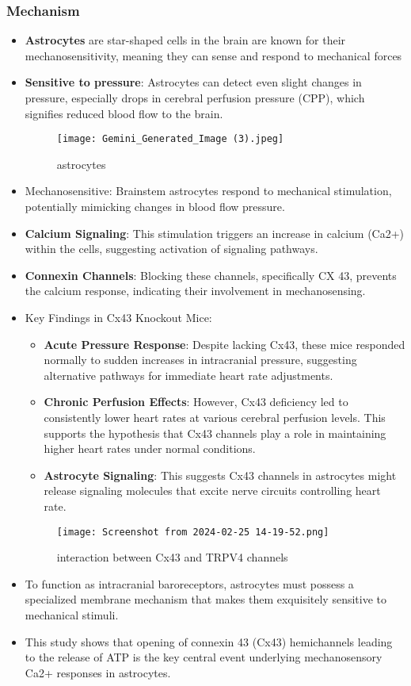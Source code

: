 \documentclass{article}
\begin{document}
\subsubsection{Mechanism}
\begin{itemize}
    \item \textbf{Astrocytes} are star-shaped cells in the brain are known for their mechanosensitivity, meaning they can sense and respond to mechanical forces
    \item \textbf{Sensitive to pressure}: Astrocytes can detect even slight changes in pressure, especially drops in cerebral perfusion pressure (CPP), which signifies reduced blood flow to the brain.
    \begin{figure}[h]
        \centering
        \texttt{[image: Gemini\_Generated\_Image (3).jpeg]}
        \caption{astrocytes}
        \label{fig:enter-label}
    \end{figure}
\item Mechanosensitive: Brainstem astrocytes respond to mechanical stimulation, potentially mimicking changes in blood flow pressure.
\item \textbf{Calcium Signaling}: This stimulation triggers an increase in calcium (Ca2+) within the cells, suggesting activation of signaling pathways.
\item \textbf{Connexin Channels}: Blocking these channels, specifically CX 43, prevents the calcium response, indicating their involvement in mechanosensing.
\item Key Findings in Cx43 Knockout Mice:
\begin{itemize}
    \item 
\textbf{Acute Pressure Response}: Despite lacking Cx43, these mice responded normally to sudden increases in intracranial pressure, suggesting alternative pathways for immediate heart rate adjustments.
\item
\textbf{Chronic Perfusion Effects}: However, Cx43 deficiency led to consistently lower heart rates at various cerebral perfusion levels. This supports the hypothesis that Cx43 channels play a role in maintaining higher heart rates under normal conditions.

\item \textbf{Astrocyte Signaling}: This suggests Cx43 channels in astrocytes might release signaling molecules that excite nerve circuits controlling heart rate.
\end{itemize}
\begin{figure}[h]
    \centering
    \texttt{[image: Screenshot from 2024-02-25 14-19-52.png]}
    \caption{interaction between Cx43 and TRPV4 channels}
    \label{fig:enter-label}
\end{figure}
\item To function as intracranial baroreceptors, astrocytes must possess a specialized membrane mechanism that makes them exquisitely sensitive to mechanical stimuli. 
\item This study shows that opening of connexin 43 (Cx43) hemichannels leading to the release of ATP is the key central event underlying mechanosensory Ca2+ responses in astrocytes.
\end{itemize}
\end{document}
